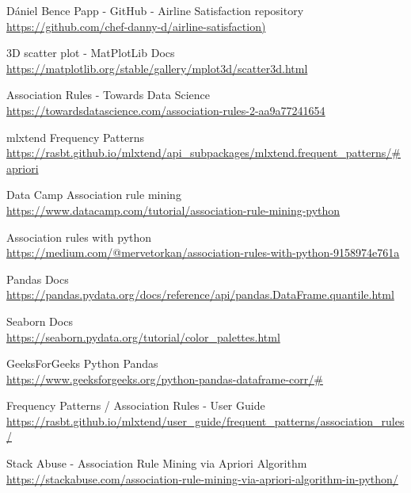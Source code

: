 \documentclass[11pt]{article}
\begin{document}
    

    \begin{thebibliography}{9}
    Dániel Bence Papp - GitHub - Airline Satisfaction repository \\
    \url{https://github.com/chef-danny-d/airline-satisfaction)}

    3D scatter plot - MatPlotLib Docs \\
    \url{https://matplotlib.org/stable/gallery/mplot3d/scatter3d.html}
    
    Association Rules - Towards Data Science \\
    \url{https://towardsdatascience.com/association-rules-2-aa9a77241654}

    mlxtend Frequency Patterns \\
    \url{https://rasbt.github.io/mlxtend/api_subpackages/mlxtend.frequent_patterns/#apriori}
    
    Data Camp Association rule mining \\
    \url{https://www.datacamp.com/tutorial/association-rule-mining-python}
    
    Association rules with python \\
    \url{https://medium.com/@mervetorkan/association-rules-with-python-9158974e761a}
    
    Pandas Docs \\
    \url{https://pandas.pydata.org/docs/reference/api/pandas.DataFrame.quantile.html}
    
    Seaborn Docs \\
    \url{https://seaborn.pydata.org/tutorial/color_palettes.html}
    
    GeeksForGeeks Python Pandas \\
    \url{https://www.geeksforgeeks.org/python-pandas-dataframe-corr/#}
    
    \bibitem{}
    Frequency Patterns / Association Rules - User Guide \\
    \url{https://rasbt.github.io/mlxtend/user_guide/frequent_patterns/association_rules/}
    
    \bibitem{}
    Stack Abuse - Association Rule Mining via Apriori Algorithm \\
    \url{https://stackabuse.com/association-rule-mining-via-apriori-algorithm-in-python/}



\end{thebibliography}
\end{document}
